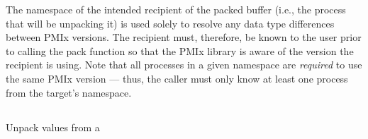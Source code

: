 The namespace of the intended recipient of the packed buffer (i.e., the
process that will be unpacking it) is used solely to resolve any data type
differences between \ac{PMIx} versions. The recipient must, therefore, be
known to the user prior to calling the pack function so that the
\ac{PMIx} library is aware of the version the recipient is using. Note that
all processes in a given namespace are \textit{required} to use the same \ac{PMIx}
version --- thus, the caller must only know at least one process from the
target's namespace.


\subsection{}

\summary

Unpack values from a 

\format



